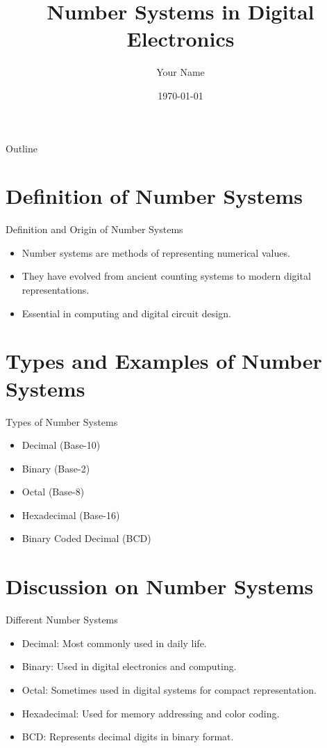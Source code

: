 \documentclass{beamer}
\title{Number Systems in Digital Electronics}
\author{Your Name}
\date{\today}
\begin{document}
\begin{frame}
    \titlepage
\end{frame}

\begin{frame}{Outline}
    \tableofcontents
\end{frame}

\section{Definition of Number Systems}
\begin{frame}{Definition and Origin of Number Systems}
    \begin{itemize}
        \item Number systems are methods of representing numerical values.
        \item They have evolved from ancient counting systems to modern digital representations.
        \item Essential in computing and digital circuit design.
    \end{itemize}
\end{frame}

\section{Types and Examples of Number Systems}
\begin{frame}{Types of Number Systems}
    \begin{itemize}
        \item Decimal (Base-10)
        \item Binary (Base-2)
        \item Octal (Base-8)
        \item Hexadecimal (Base-16)
        \item Binary Coded Decimal (BCD)
    \end{itemize}
\end{frame}

\section{Discussion on Number Systems}
\begin{frame}{Different Number Systems}
    \begin{itemize}
        \item Decimal: Most commonly used in daily life.
        \item Binary: Used in digital electronics and computing.
        \item Octal: Sometimes used in digital systems for compact representation.
        \item Hexadecimal: Used for memory addressing and color coding.
        \item BCD: Represents decimal digits in binary format.
    \end{itemize}
\end{frame}
\end{document}
